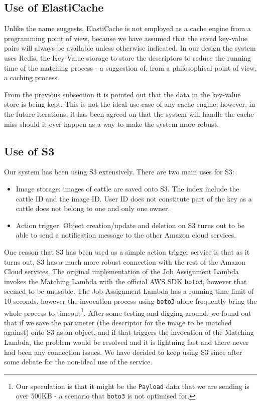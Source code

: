 \subsection{Use of ElastiCache}

Unlike the name suggests, ElastiCache is not employed as a cache engine from a programming point of view, because we have assumed that the saved key-value pairs will always be available unless otherwise indicated. In our design the system uses Redis, the Key-Value storage to store the descriptors to reduce the running time of the matching process - a suggestion of, from a philosophical point of view, a caching process.

From the previous subsection it is pointed out that the data in the key-value store is being kept. This is not the ideal use case of any cache engine; however, in the future iterations, it has been agreed on that the system will handle the cache miss should it ever happen as a way to make the system more robust.

\subsection{Use of S3}

Our system has been using S3 extensively. There are two main uses for S3:

\begin{itemize}
	\item Image storage: images of cattle are saved onto S3. The index include the cattle ID and the image ID. User ID does not constitute part of the key as a cattle does not belong to one and only one owner.
	\item Action trigger. Object creation/update and deletion on S3 turns out to be able to send a notification message to the other Amazon cloud services.
\end{itemize}

One reason that S3 has been used as a simple action trigger service is that as it turns out, S3 has a much more robust connection with the rest of the Amazon Cloud services. The original implementation of the Job Assignment Lambda invokes the Matching Lambda with the official AWS SDK \texttt{boto3}, however that seemed to be unusable. The Job Assignment Lambda has a running time limit of 10 seconds, however the invocation process using \texttt{boto3} alone frequently bring the whole process to timeout\footnote{Our speculation is that it might be the \texttt{Payload} data that we are sending is over 500KB - a scenario that \texttt{boto3} is not optimised for.}. After some testing and digging around, we found out that if we save the parameter (the descriptor for the image to be matched against) onto S3 as an object, and if that triggers the invocation of the Matching Lambda, the problem would be resolved and it is lightning fast and there never had been any connection issues. We have decided to keep using S3 since after some debate for the non-ideal use of the service.

